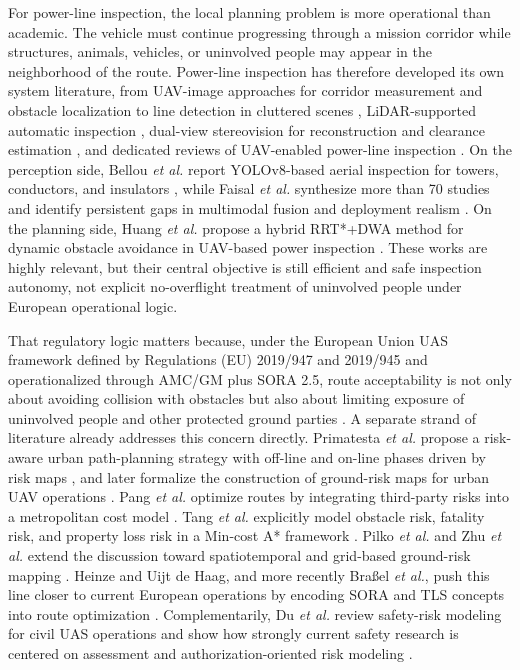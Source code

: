 \documentclass[a4paper,11pt]{article}
\begin{document}
For power-line inspection, the local planning problem is more operational than academic. The vehicle must continue progressing through a mission corridor while structures, animals, vehicles, or uninvolved people may appear in the neighborhood of the route. Power-line inspection has therefore developed its own system literature, from UAV-image approaches for corridor measurement and obstacle localization \cite{zhang2017powerline} to line detection in cluttered scenes \cite{zhang2019powerlines}, LiDAR-supported automatic inspection \cite{guan2021uavlidar}, dual-view stereovision for reconstruction and clearance estimation \cite{zhou2022dualview}, and dedicated reviews of UAV-enabled power-line inspection \cite{mendu2025state}. On the perception side, Bellou \emph{et al.} report YOLOv8-based aerial inspection for towers, conductors, and insulators \cite{bellou2024aerial}, while Faisal \emph{et al.} synthesize more than 70 studies and identify persistent gaps in multimodal fusion and deployment realism \cite{faisal2025deep}. On the planning side, Huang \emph{et al.} propose a hybrid RRT*+DWA method for dynamic obstacle avoidance in UAV-based power inspection \cite{huang2025hybrid}. These works are highly relevant, but their central objective is still efficient and safe inspection autonomy, not explicit no-overflight treatment of uninvolved people under European operational logic.

That regulatory logic matters because, under the European Union UAS framework defined by Regulations (EU) 2019/947 and 2019/945 and operationalized through AMC/GM plus SORA 2.5, route acceptability is not only about avoiding collision with obstacles but also about limiting exposure of uninvolved people and other protected ground parties \cite{EU2019_947,EU2019_945,JARUS_SORA_2_5_2024,EASA_AMC_GM_SORA25_2025}. A separate strand of literature already addresses this concern directly. Primatesta \emph{et al.} propose a risk-aware urban path-planning strategy with off-line and on-line phases driven by risk maps \cite{primatesta2019riskaware}, and later formalize the construction of ground-risk maps for urban UAV operations \cite{primatesta2020groundrisk}. Pang \emph{et al.} optimize routes by integrating third-party risks into a metropolitan cost model \cite{pang2022integrated}. Tang \emph{et al.} explicitly model obstacle risk, fatality risk, and property loss risk in a Min-cost A* framework \cite{tang2023thirdparty}. Pilko \emph{et al.} and Zhu \emph{et al.} extend the discussion toward spatiotemporal and grid-based ground-risk mapping \cite{pilko2023spatiotemporal,zhang2023groundrisk}. Heinze and Uijt de Haag, and more recently Bra{\ss}el \emph{et al.}, push this line closer to current European operations by encoding SORA and TLS concepts into route optimization \cite{heinze2023sora,brassel2025riskaware}. Complementarily, Du \emph{et al.} review safety-risk modeling for civil UAS operations and show how strongly current safety research is centered on assessment and authorization-oriented risk modeling \cite{du2024safetyrisk}.
\end{document}
